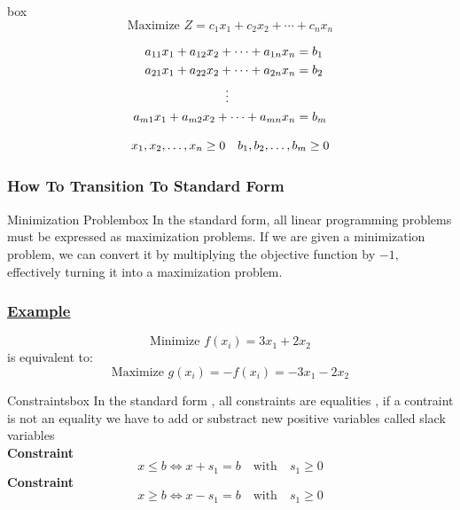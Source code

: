 \begin{prettyBox}{}{box}
\[
    \text{Maximize } Z = c_1x_1 + c_2x_2 + \cdots + c_nx_n
\]

\vspace{0.25cm}
\hspace{1cm}
\[
\begin{aligned}
    a_{11}x_1 + a_{12}x_2 + \cdots + a_{1n}x_n &= b_1 \\
    a_{21}x_1 + a_{22}x_2 + \cdots + a_{2n}x_n &= b_2 \\
    &\hspace{-2cm}\vdots \\
    a_{m1}x_1 + a_{m2}x_2 + \cdots + a_{mn}x_n &= b_m
\end{aligned}
\]

\[
    x_1, x_2, \dots, x_n \geq 0 \hspace{0.35cm} b_1, b_2, \dots, b_m \geq 0 
\]
\end{prettyBox}

\subsubsection{How To Transition To Standard Form}


\begin{prettyBox}{Minimization Problem}{box}
In the standard form, all linear programming problems must be expressed as maximization problems. If we are given a minimization problem, 
we can convert it by multiplying the objective function by \(-1\), effectively turning it into a maximization problem.
\end{prettyBox}

\subsubsection*{\underline{Example}}
\[
\text{Minimize } f(x_i) = 3x_1 + 2x_2
\]
is equivalent to:
\[
\text{Maximize } g(x_i) = -f(x_i) = -3x_1 - 2x_2
\]

\vspace{0.5cm}
\begin{prettyBox}{Constraints}{box}
In the standard form , all constraints are equalities , if a contraint is not an equality
we have to add or substract new positive variables called slack variables\\[0.25cm]
\boldsymbol{\leq} \textbf{Constraint}
\begin{equation*}
x \leq b \Leftrightarrow x + s_1 = b \quad \text{with} \quad s_1 \geq 0
\end{equation*}
\boldsymbol{\geq} \textbf{Constraint}
\begin{equation*}
    x\geq b \Leftrightarrow x-s_1=b \quad \text{with} \quad s_1\geq 0
\end{equation*}
\end{prettyBox}

